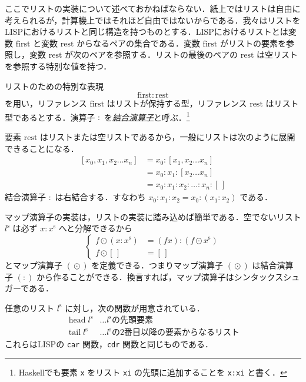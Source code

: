 \documentclass[a4paper,draft]{jsbook}
\newcommand{\programminglanguage}[1]{\textsf{#1}}
\newcommand{\haskell}{\programminglanguage{Haskell}}
\newcommand{\lisp}{\programminglanguage{LISP}}
\newcommand{\keyword}[1]{{\underline{\emph{#1}}}}
\newcommand{\code}[1]{\texttt{#1}}
\newcommand{\mSpecialVar}[1]{\mathrm{#1}} %
\newcommand{\mFirstVar}{\mSpecialVar{first}}
\newcommand{\mRestVar}{\mSpecialVar{rest}}
\newcommand{\mEmptyList}{{[\,]}}
\newcommand{\mListOf}[1]{\left[#1\right]}
\newcommand{\mListVar}[1]{{#1}^\mathrm{s}}
\DeclareMathOperator{\mMapList}{\odot}
\DeclareMathOperator{\mHead}{head}
\DeclareMathOperator{\mTail}{tail}
\newcommand{\mathVarKeyword}[1]{\operatorname{\mathrm{#1}}}
\newcommand{\mFirstVar}{\mathVarKeyword{first}}
\begin{document}
ここでリストの実装について述べておかねばならない．紙上ではリストは自由に考えられるが，計算機上ではそれほど自由ではないからである．我々はリストを\lisp におけるリストと同じ構造を持つものとする．\lisp におけるリストとは変数 $\mFirstVar$ と変数 $\mRestVar$ からなるペアの集合である．変数 $\mFirstVar$ がリストの要素を参照し，変数 $\mRestVar$ が次のペアを参照する．リストの最後のペアの $\mRestVar$ は空リストを参照する特別な値を持つ．

リストのための特別な表現
\begin{equation}
\mFirstVar:\mRestVar
\end{equation}
を用い，リファレンス $\mFirstVar$ はリストが保持する型，リファレンス $\mRestVar$ はリスト型であるとする．演算子 $:$ を\keyword{結合演算子}と呼ぶ．\footnote{\haskell でも要素 \code{x} をリスト \code{xi} の先頭に追加することを \code{x:xi} と書く．}

要素 $\mRestVar$ はリストまたは空リストであるから，一般にリストは次のように展開できることになる．
\begin{align*}
\mListOf{x_0,x_1,x_2\dots x_n}
  &=x_0:\mListOf{x_1,x_2\dots x_n}\\
  &=x_0:x_1:\mListOf{x_2\dots x_n}\\
  &=x_0:x_1:x_2:\dots:x_n:\mEmptyList
\end{align*}
結合演算子 $:$ は右結合する．すなわち $x_0:x_1:x_2=x_0:(x_1:x_2)$ である．

マップ演算子の実装は，リストの実装に踏み込めば簡単である．空でないリスト $\mListVar{l}$ は必ず $x:\mListVar{x}$ へと分解できるから
\begin{equation}
\left\{
\begin{split}
f\mMapList(x:\mListVar{x})
  &=(fx):(f\mMapList\mListVar{x})\\
f\mMapList\mEmptyList
  &=\mEmptyList
\end{split}
\right.
\end{equation}
とマップ演算子 $(\mMapList)$ を定義できる．つまりマップ演算子 $(\mMapList)$ は結合演算子 $(:)$ から作ることができる．換言すれば，マップ演算子はシンタックスシュガーである．

任意のリスト $\mListVar{l}$ に対し，次の関数が用意されている．
\begin{align*}
\mHead\mListVar{l}&\dots\text{$\mListVar{l}$の先頭要素}\\
\mTail\mListVar{l}&\dots\text{$\mListVar{l}$の2番目以降の要素からなるリスト}
\end{align*}
これらは\lisp  の \code{car} 関数，\code{cdr} 関数と同じものである．
\end{document}
